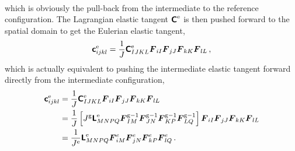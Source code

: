 \documentclass[10pt,letterpaper,oneside]{report}
\newcommand{\ten}[1]{\mbox{\boldmath $#1$}{}}
\newcommand{\tenf}[1]{\mbox{{\sffamily{\bfseries {#1}}}}}
\newcommand{\scas}[1]{\mbox{{\scriptsize{${\rm{#1}}$}}}{}}
\begin{document}
\begin{itemize}
\begin{align}
\end{align}
which is obviously the pull-back from the intermediate to the reference configuration.  The Lagrangian elastic tangent $\tenf{C}^{\scas{e}}$ is then pushed forward to the spatial domain to get the Eulerian elastic tangent, 
\begin{equation}
\tenf{c}^{\scas{e}}_{ijkl} = \frac{1}{J} \tenf{C}^{\scas{e}}_{IJKL} \ten{F}_{iI} \ten{F}_{jJ} \ten{F}_{kK} \ten{F}_{lL} \, ,
\end{equation}
which is actually equivalent to pushing the intermediate elastic tangent forward directly from the intermediate configuration,
\begin{align}
\tenf{c}^{\scas{e}}_{ijkl} ={}& \frac{1}{J} \tenf{C}^{\scas{e}}_{IJKL} \ten{F}_{iI} \ten{F}_{jJ} \ten{F}_{kK} \ten{F}_{lL} \\
={}& \frac{1}{J} \left[ J^{\scas{g}} \tenf{L}^{\scas{e}}_{MNPQ} \ten{F}^{\scas{g}-1}_{IM} \ten{F}^{\scas{g}-1}_{JN} \ten{F}^{\scas{g}-1}_{KP} \ten{F}^{\scas{g}-1}_{LQ} \right] \ten{F}_{iI} \ten{F}_{jJ} \ten{F}_{kK} \ten{F}_{lL} \notag \\
={}& \frac{1}{J^{\scas{e}}} \tenf{L}^{\scas{e}}_{MNPQ} \ten{F}^{e}_{iM} \ten{F}^{e}_{jN} \ten{F}^{e}_{kP}  \ten{F}^{e}_{lQ} \, .  
\end{align}


\end{itemize}
\end{document}
